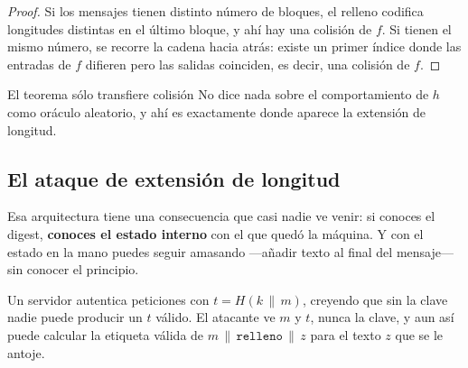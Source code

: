 \documentclass[11pt,a4paper]{article}
\theoremstyle{definition}
\theoremstyle{plain}
\theoremstyle{remark}
\newcommand{\concat}{\,\|\,}
\begin{document}
\begin{proof}
Si los mensajes tienen distinto número de bloques, el relleno codifica longitudes
distintas en el último bloque, y ahí hay una colisión de $f$. Si tienen el mismo
número, se recorre la cadena hacia atrás: existe un primer índice donde las
entradas de $f$ difieren pero las salidas coinciden, es decir, una colisión de
$f$.
\end{proof}

\begin{aviso}{El teorema sólo transfiere colisión}
No dice nada sobre el comportamiento de $h$ como oráculo aleatorio, y ahí es
exactamente donde aparece la extensión de longitud.
\end{aviso}

\subsection{El ataque de extensión de longitud}

Esa arquitectura tiene una consecuencia que casi nadie ve venir: si conoces el
digest, \textbf{conoces el estado interno} con el que quedó la máquina. Y con el
estado en la mano puedes seguir amasando ---añadir texto al final del mensaje---
sin conocer el principio.

Un servidor autentica peticiones con $t = H(k \concat m)$, creyendo que sin la
clave nadie puede producir un $t$ válido. El atacante ve $m$ y $t$, nunca la
clave, y aun así puede calcular la etiqueta válida de
$m \concat \texttt{relleno} \concat z$ para el texto $z$ que se le antoje.
\end{document}
